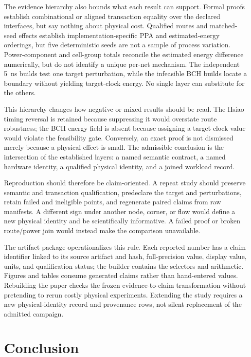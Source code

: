\documentclass[conference,10pt]{IEEEtran}
\begin{document}
The evidence hierarchy also bounds what each result can support. Formal proofs establish combinational or aligned transaction equality over the declared interfaces, but say nothing about physical cost. Qualified routes and matched-seed effects establish implementation-specific PPA and estimated-energy orderings, but five deterministic seeds are not a sample of process variation. Power-component and cell-group totals reconcile the estimated energy difference numerically, but do not identify a unique per-net mechanism. The independent 5~ns builds test one target perturbation, while the infeasible BCH builds locate a boundary without yielding target-clock energy. No single layer can substitute for the others.

This hierarchy changes how negative or mixed results should be read. The Hsiao timing reversal is retained because suppressing it would overstate route robustness; the BCH energy field is absent because assigning a target-clock value would violate the feasibility gate. Conversely, an exact proof is not dismissed merely because a physical effect is small. The admissible conclusion is the intersection of the established layers: a named semantic contract, a named hardware identity, a qualified physical identity, and a joined workload record.

Reproduction should therefore be claim-oriented. A repeat study should preserve semantic and transaction qualification, predeclare the target and perturbations, retain failed and ineligible points, and regenerate paired claims from raw manifests. A different sign under another node, corner, or flow would define a new physical identity and be scientifically informative. A failed proof or broken route/power join would instead make the comparison unavailable.

The artifact package operationalizes this rule. Each reported number has a claim identifier linked to its source artifact and hash, full-precision value, display value, units, and qualification status; the builder contains the selectors and arithmetic. Figures and tables consume generated claims rather than hand-entered values. Rebuilding the paper checks the frozen evidence-to-claim transformation without pretending to rerun costly physical experiments. Extending the study requires a new physical-identity record and provenance rows, not silent replacement of the admitted campaign.

\section{Conclusion}
\end{document}
